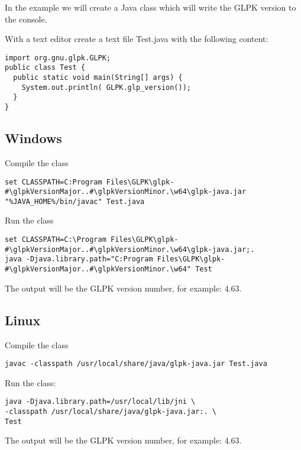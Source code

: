 \documentclass[a4paper,11pt]{report}
\newcommand{\glpkVersionMajor}{4}
\newcommand{\glpkVersionMinor}{63}
\begin{document}
In the example we will create a Java class which will write the GLPK version to the console.

With a text editor create a text file Test.java with the following content:

\begin{lstlisting}
import org.gnu.glpk.GLPK;
public class Test {
  public static void main(String[] args) {
    System.out.println( GLPK.glp_version());
  }
}
\end{lstlisting}

\subsection{Windows}

Compile the class

\begin{lstlisting}
set CLASSPATH=C:Program Files\GLPK\glpk-#\glpkVersionMajor..#\glpkVersionMinor.\w64\glpk-java.jar
"%JAVA_HOME%/bin/javac" Test.java
\end{lstlisting}

Run the class

\begin{lstlisting}
set CLASSPATH=C:\Program Files\GLPK\glpk-#\glpkVersionMajor..#\glpkVersionMinor.\w64\glpk-java.jar;.
java -Djava.library.path="C:Program Files\GLPK\glpk-#\glpkVersionMajor..#\glpkVersionMinor.\w64" Test
\end{lstlisting}

The output will be the GLPK version number, for example: \glpkVersionMajor.\glpkVersionMinor.

\subsection{Linux}
Compile the class

\begin{lstlisting}
javac -classpath /usr/local/share/java/glpk-java.jar Test.java
\end{lstlisting}

Run the class:

\begin{lstlisting}
java -Djava.library.path=/usr/local/lib/jni \
-classpath /usr/local/share/java/glpk-java.jar:. \
Test
\end{lstlisting}

The output will be the GLPK version number, for example: \glpkVersionMajor.\glpkVersionMinor.
\end{document}
